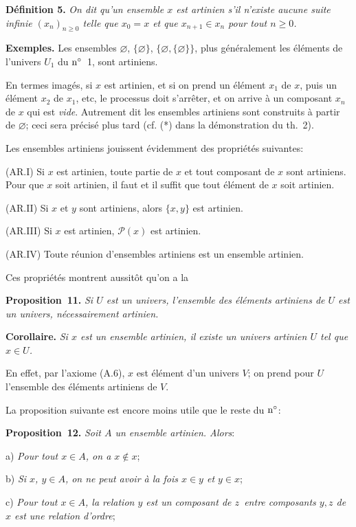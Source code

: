 \documentclass[12pt]{article}
\newcommand{\nn}{\noindent}
\begin{document}
\nn\textbf{Définition 5.} \emph{On dit qu'un ensemble $x$ est artinien s'il n'existe aucune suite infinie $(x_n)_{n\geq 0}$ telle que $x_0=x$ et que $x_{n+1}\in x_n$ pour tout $n\geq 0$.}

\nn\textbf{Exemples.} Les ensembles $\varnothing$, $\{\varnothing\}$, $\{\varnothing,\{\varnothing\}\}$, plus généralement les éléments de l'univers $U_1$ du $\rm n^\circ$~1, sont artiniens.

En termes imagés, si $x$ est artinien, et si on prend un élément $x_1$ de $x$, puis un élément $x_2$ de $x_1$, etc, le processus doit s'arrêter, et on arrive à un composant $x_n$ de $x$ qui est \emph{vide}. Autrement dit les ensembles artiniens sont \og construits à partir de $\varnothing$\fg; ceci sera précisé plus tard (cf. (*) dans la démonstration du th.~2).

Les ensembles artiniens jouissent évidemment des propriétés suivantes:

\nn(AR.I) Si $x$ est artinien, toute partie de $x$ et tout composant de $x$ sont artiniens. Pour que $x$ soit artinien, il faut et il suffit que tout élément de $x$ soit artinien.

\nn(AR.II) Si $x$ et $y$ sont artiniens, alors $\{x,y\}$ est
artinien.

\nn(AR.III) Si $x$ est artinien, $\mathcal{P}(x)$ est artinien.

\nn(AR.IV) Toute réunion d'ensembles artiniens est un ensemble artinien.

Ces propriétés montrent aussitôt qu'on a la

\nn\textbf{Proposition~11.} \emph{Si $U$ est un univers, l'ensemble des éléments artiniens de $U$ est un univers, nécessairement artinien.}

\nn \textbf{Corollaire.} \emph{Si $x$ est un ensemble artinien, il existe un univers artinien $U$ tel que $x\in U$.}

En effet, par l'axiome (A.6), $x$ est élément d'un univers $V$; on prend pour $U$ l'ensemble des éléments artiniens de $V$.

La proposition suivante est encore moins utile que le reste du $\rm n^\circ$:

\nn\textbf{Proposition~12.} \emph{Soit $A$ un ensemble artinien. Alors}:

\nn a) \emph{Pour tout $x\in A$, on a $x\not\in x$};

\nn b) \emph{Si $x$, $y\in A$, on ne peut avoir à la fois $x\in y$ et $y\in x$};

\nn c) \emph{Pour tout $x\in A$, la relation \og$y$ est un composant de $z$\fg\ entre composants $y,z$ de $x$ est une relation d'ordre};
\end{document}
